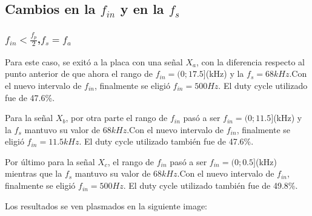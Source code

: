 \documentclass[../../ASSD_TP1_G7.tex]{subfiles}
\begin{document}
\subsection{Cambios en la $f_{in}$ y en la $f_{s}$}

\subsubsection{$f_{in}<\frac{f_{p}}{2}$,$f_{s}=f_{a}$}

Para este caso, se exitó a la placa con una señal $X_{a}$, con la
diferencia respecto al punto anterior de que ahora el rango de $f_{in}=(0;17.5]$(kHz)
y la $f_{s}=68kHz.$Con el nuevo intervalo de $f_{in}$, finalmente
se eligió $f_{in}=500Hz.$ El duty cycle utilizado fue de 47.6\%.

Para la señal $X_{b}$, por otra parte el rango de $f_{in}$ pasó
a ser $f_{in}=(0;11.5]$(kHz) y la $f_{s}$ mantuvo su valor de $68kHz.$Con
el nuevo intervalo de $f_{in}$, finalmente se eligió $f_{in}=11.5kHz.$
El duty cycle utilizado también fue de 47.6\%.

Por último para la señal $X_{c}$, el rango de $f_{in}$ pasó a ser
$f_{in}=(0;0.5]$(kHz) mientras que la $f_{s}$ mantuvo su valor de
$68kHz.$Con el nuevo intervalo de $f_{in}$, finalmente se eligió
$f_{in}=500Hz.$ El duty cycle utilizado también fue de 49.8\%.

Los resultados se ven plasmados en la siguiente image:
\end{document}

